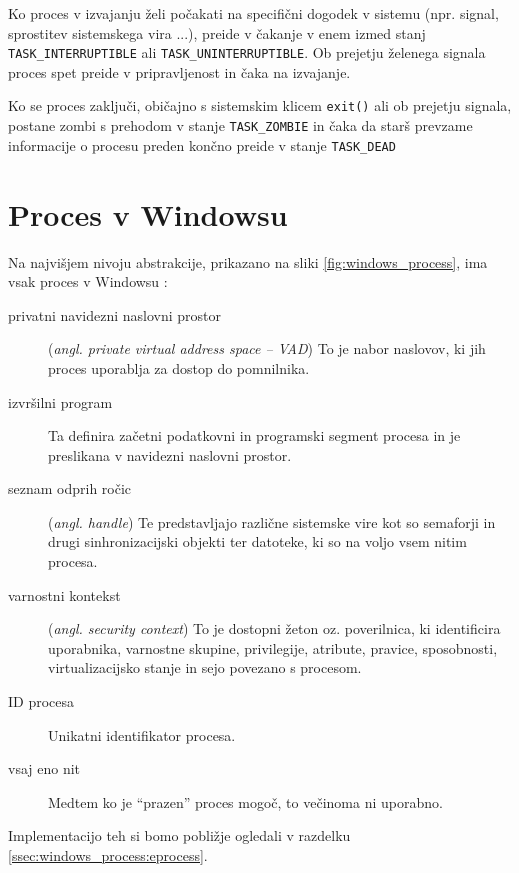 \documentclass[a4paper,12pt,openright]{book}
\begin{document}
Ko proces v izvajanju želi počakati na specifični dogodek v sistemu (npr. signal, sprostitev sistemskega vira ...), preide v čakanje v enem izmed stanj \texttt{TASK\_INTERRUPTIBLE} ali \texttt{TASK\_UNINTERRUPTIBLE}.
Ob prejetju želenega signala proces spet preide v pripravljenost in čaka na izvajanje.

Ko se proces zaključi, običajno s sistemskim klicem \texttt{exit()} ali ob prejetju signala, postane zombi s prehodom v stanje \texttt{TASK\_ZOMBIE} in čaka da starš prevzame informacije o procesu preden končno preide v stanje \texttt{TASK\_DEAD}

\section{Proces v Windowsu}

Na najvišjem nivoju abstrakcije, prikazano na sliki \ref{fig:windows_process}, ima vsak proces v Windowsu \cite{Yosifovich_Russinovich_Solomon_Ionescu_2017}:
\begin{description}
	\item[privatni navidezni naslovni prostor] (\textit{angl. private virtual address space -- VAD}) To je nabor naslovov, ki jih proces uporablja za dostop do pomnilnika.
	\item[izvršilni program] Ta definira začetni podatkovni in programski segment procesa in je preslikana v navidezni naslovni prostor.
	\item[seznam odprih ročic]  (\textit{angl. handle}) Te predstavljajo različne sistemske vire kot so semaforji in drugi sinhronizacijski objekti ter datoteke, ki so na voljo vsem nitim procesa.
	\item[varnostni kontekst] (\textit{angl. security context}) To je dostopni žeton oz. poverilnica, ki identificira uporabnika, varnostne skupine, privilegije, atribute, pravice, sposobnosti, virtualizacijsko stanje in sejo povezano s procesom.
	\item[ID procesa] Unikatni identifikator procesa.
	\item[vsaj eno nit] Medtem ko je ``prazen'' proces mogoč, to večinoma ni uporabno. 
\end{description}
Implementacijo teh si bomo pobližje ogledali v razdelku \ref{ssec:windows_process:eprocess}.
\end{document}
